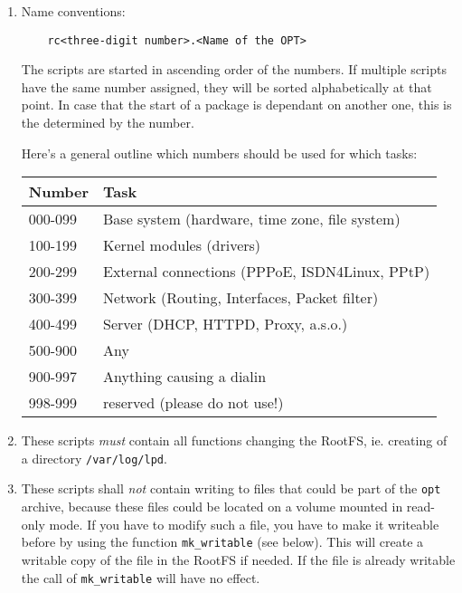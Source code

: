 \begin{enumerate}
  \item Name conventions:

\begin{example}
\begin{verbatim}
    rc<three-digit number>.<Name of the OPT>
\end{verbatim}
\end{example}
      
    The scripts are started in ascending order of the numbers.
    If multiple scripts have the same number assigned, they
    will be sorted alphabetically at that point. In case
    that the start of a package is dependant on another one,
    this is the determined by the number.

    Here's a general outline which numbers should be used for
    which tasks:    
    
    \begin{table}[htbp]
    \centering
    \begin{tabular}{ll}
            \hline
            Number        &       Task         \\
            \hline
            \hline
            000-099       &       Base system (hardware, time zone, file system) \\
            100-199       &       Kernel modules (drivers) \\
            200-299       &       External connections (PPPoE, ISDN4Linux, PPtP) \\
            300-399       &       Network (Routing, Interfaces, Packet filter) \\
            400-499       &       Server (DHCP, HTTPD, Proxy, a.s.o.) \\
            500-900       &       Any \\
            900-997       &       Anything causing a dialin \\
            998-999       &       reserved (please do not use!) \\
            \hline
    \end{tabular}
    \end{table}

  \item These scripts \emph{must} contain all functions changing the RootFS,
    ie. creating of a directory \texttt{/var/log/lpd}.

  \item These scripts shall \emph{not} contain writing to files that could be
    part of the \texttt{opt} archive, because these files could be located on
    a volume mounted in read-only mode. If you have to modify such a file, you
    have to make it writeable before by using the function \texttt{mk\_writable}
    (see below). This will create a writable copy of the file in the RootFS
    if needed. If the file is already writable the call of \texttt{mk\_writable}
    will have no effect.
    

\end{enumerate}
